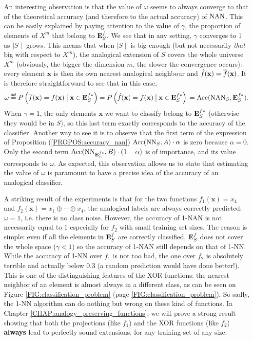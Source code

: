 An interesting observation is that the value of $\omega$ seems to always
converge to that of the theoretical accuracy (and therefore to the actual
accuracy) of $\mbox{NAN}$. This can be easily explained by paying attention to the
value of $\gamma$, the proportion of elements of $X^m$ that belong to $\mathbf{E}_{S}^{f}$.
We see that in any setting, $\gamma$ converges to 1 as $\mid S \mid$ grows.
This means that when $\mid S \mid$ is big enough (but not necessarily
\textit{that} big with respect to $X^m$), the analogical extension of $S$
covers the whole universe $X^m$ (obviously, the bigger the dimension $m$, the
slower the convergence occurs): every element $\mathbf{x}$ is then its own
nearest analogical neighbour and $\hat{f}(\mathbf{x}) = \overline{f}(\mathbf{x})$. It
is therefore straightforward to see that in this case,
$$
  \omega \eqdef P\left(\albl{\mathbf{x}} = f(\mathbf{x}) \given[\big]
  \mathbf{x} \in \esfs\right) = P\left(\hat{f}(\mathbf{x}) = f(\mathbf{x})
  \given[\big] \mathbf{x} \in \esfs\right)\\ = \acc(\NAN_S, \esfs).
$$
When $\gamma = 1$, the only elements $\mathbf{x}$ we want to classify belong to
$\mathbf{E}_{S}^{f*}$ (otherwise they would be in $S$), so this last term exactly corresponds
to the accuracy of the classifier. Another way to see it is to observe that the
first term of the expression of Proposition (\ref{PROPOS:accuracy_nan})
$\mbox{Acc}(\text{NN}_{S}, A) \cdot \alpha$ is zero
because $\alpha = 0$. Only the second term $\mbox{Acc}(\text{NN}_{\mathbf{E}_{S}^{f*}}, B) \cdot (1 -
\alpha)$ is of importance, and its value corresponds to $\omega$. As expected,
this observation allows us to state that estimating the value of $\omega$ is
paramount to have a precise idea of the accuracy of an analogical classifier.

A striking result of the experiments is that for the two functions
$f_1(\mathbf{x}) = x_4$ and $f_2(\mathbf{x}) = x_1 \oplus \cdots \oplus x_4$,
the analogical labels are always correctly predicted: $\omega = 1$, i.e. there
is no class noise. However, the accuracy of 1-NAN is not necessarily equal to
$1$ especially for $f_2$ with small training set sizes. The reason is simple:
even if all the elements in $\mathbf{E}_{S}^{f}$ are correctly classified, $\mathbf{E}_{S}^{f}$ does not
cover the whole space ($\gamma < 1$) so the accuracy of 1-NAN still depends on
that of 1-NN. While the accuracy of 1-NN over $f_1$ is not too bad, the one
over $f_2$ is absolutely terrible and actually below $0.3$ (a random prediction
would have done better!). This is one of the distinguishing features of the XOR
functions: the nearest neighbor of an element is almost always in a different
class, as can be seen on Figure \ref{FIG:classification_problem} (page
\ref{FIG:classification_problem}). So sadly, the 1-NN algorithm can do nothing
but wrong on these kind of functions. In Chapter
\ref{CHAP:analogy_preserving_functions}, we will prove a strong result showing
that both the projections (like $f_1$) and the XOR functions (like $f_2$)
\textbf{always} lead to perfectly sound extensions, for any training set of any
size.

